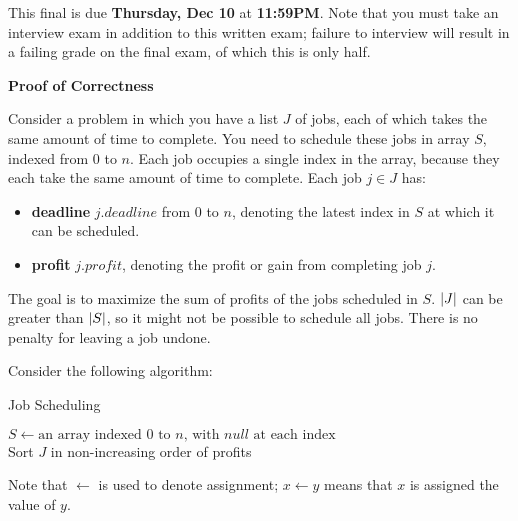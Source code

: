 \documentclass[12pt,twoside]{article}
\newcommand{\releasedate}{Dec 8, 2020}
\newcommand{\partaduedate}{Thursday, Dec 10}
\begin{document}
\handout{Final Exam}{\releasedate}

This final is due {\bf \partaduedate} at {\bf 11:59PM}. Note that you 
must take an interview exam in addition to this written exam; failure to
interview will result in a failing grade on the final exam, of which this
is only half.

\medskip

\hrulefill

\begin{problems}

\problem {} \textbf{Proof of Correctness}

Consider a problem in which you have a list $J$ of jobs,
each of which takes the same amount of time to complete. You need to
schedule these jobs in array $S$, indexed from $0$ to $n$. Each
job occupies a single index in the array, because they each take the
same amount of time to complete. Each job $j \in J$ has:

\begin{itemize}
  \item {\bf deadline} $j.deadline$ from $0$ to $n$, denoting the
    latest index in $S$ at which it can be scheduled.
  \item {\bf profit} $j.profit$, denoting the profit or gain
    from completing job $j$.
\end{itemize}

The goal is to maximize the sum of profits of the jobs scheduled in
$S$. $\left| J\right|$ can be greater than $\left| S\right|$, so it might not be
possible to schedule all jobs. There is no penalty for leaving
a job undone.

Consider the following algorithm:

\begin{algorithm}[H]
  \caption{Job Scheduling}
  $S \leftarrow \text{an array indexed $0$ to $n$, with $null$ at each index}$\\
  Sort $J$ in non-increasing order of profits\\
\end{algorithm}

Note that $\leftarrow$ is used to denote assignment; $x\leftarrow y$ means that
$x$ is assigned the value of $y$.


\end{problems}
\end{document}
